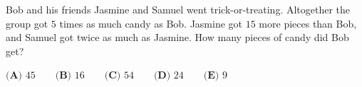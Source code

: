Bob and his friends Jasmine and Samuel went trick-or-treating. Altogether the group got $5$ times as much candy as Bob. Jasmine got $15$ more pieces than Bob, and Samuel got twice as much as Jasmine. How many pieces of candy did Bob get?

$\textbf{(A) }45\qquad\textbf{(B) }16\qquad\textbf{(C) }54\qquad\textbf{(D) }24\qquad\textbf{(E) }9$

